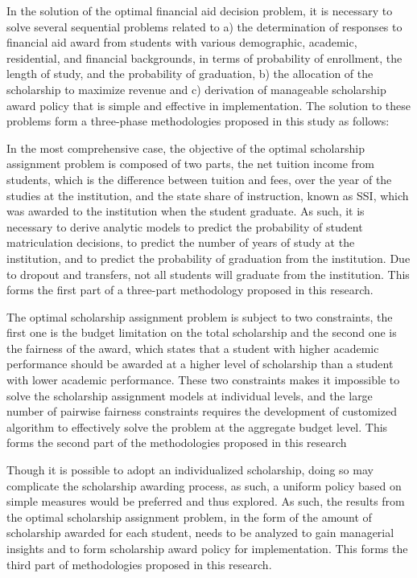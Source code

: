 \documentclass[12pt,english]{report}
\begin{document}
In the solution of the optimal financial aid decision problem,  it is necessary
to solve several sequential problems related to a) the determination of
responses to financial aid award from students with various demographic,
academic, residential, and financial backgrounds, in terms of probability of
enrollment, the length of study, and the probability of graduation, b) the
allocation of the scholarship to maximize revenue and c) derivation of
manageable scholarship award policy that is simple and effective in
implementation.
 The solution to these problems form a three-phase
methodologies proposed in this study as follows:


In the most comprehensive case, the objective of the optimal scholarship
assignment problem is composed of two parts, the net tuition income from
students, which is the difference between tuition and fees, over the year of
the
studies at the institution, and the state share of instruction, known as SSI,
which was awarded to the institution when the student graduate.  As such,  it
is necessary to derive analytic models to predict the probability of student
matriculation decisions, to predict the number of years of study at the
institution, and to predict the probability of graduation from the institution.
Due to dropout and transfers, not all students will graduate from the
institution.  This forms the first part of a three-part methodology proposed
in this research.

The optimal scholarship assignment problem is subject to two constraints, the
first one is the budget limitation on the total scholarship and the second one
is the fairness of the award, which states that  a student with higher
academic performance should be awarded at a higher level of scholarship than
a student with lower academic performance.  These two constraints makes it
impossible to solve the scholarship assignment models at individual levels, and
the large number of pairwise fairness constraints requires the development of
customized algorithm to effectively solve the problem at the aggregate budget
level.  This forms the second part of the methodologies proposed in this
research

Though it is possible to adopt an individualized scholarship, doing so may
complicate the scholarship awarding process, as such, a uniform policy based on
simple measures would be preferred and thus explored.  As such, the results
from the optimal scholarship assignment problem, in the form of the amount of
scholarship awarded for each student, needs to be analyzed to gain managerial
insights and to form scholarship award policy for implementation.  This forms
the third part of methodologies proposed in this research.
\end{document}
